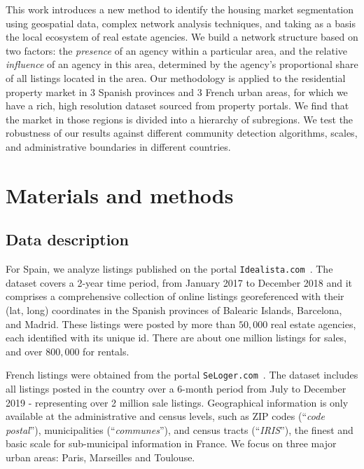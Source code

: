 This work introduces a new method to identify the housing market segmentation using geospatial data, complex network analysis techniques, and taking as a basis the local ecosystem of real estate agencies. We build a network structure based on two factors:  the \textit{presence} of an agency within a particular area, and the relative \textit{influence} of an agency in this area, determined by the agency's proportional share of all listings located in the area. Our methodology is applied to the residential property market in 3 Spanish provinces and 3 French urban areas, for which we have a rich, high resolution dataset sourced from property portals. We find that the market in those regions is divided into a hierarchy of subregions. We test the robustness of our results against different community detection algorithms, scales, and administrative boundaries in different countries.

\section{Materials and methods}
\label{sec:materials_and_methods}

\subsection{Data description}

For Spain, we analyze listings published on the portal \texttt{Idealista.com}~\cite{idealista}. The dataset covers a 2-year time period, from January 2017 to December 2018 and it comprises a comprehensive collection of online listings georeferenced with their (lat, long) coordinates in the Spanish provinces of Balearic Islands, Barcelona, and Madrid. These listings were posted by more than $50,000$ real estate agencies, each identified with its unique id. There are about one million listings for sales, and over $800,000$ for rentals. 

French listings were obtained from the portal \texttt{SeLoger.com}~\cite{SeLoger}. The dataset includes all listings posted in the country over a 6-month period from July to December 2019 - representing over 2 million sale listings. Geographical information is only available at the administrative and census levels, such as ZIP codes (``\textit{code postal}''), municipalities (``\textit{communes}''), and census tracts (``\textit{IRIS}''), the finest and basic scale for sub-municipal information in France. We focus on three major urban areas: Paris, Marseilles and Toulouse. 

